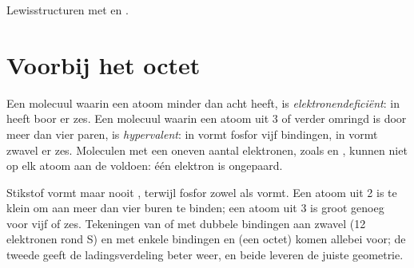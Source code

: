 \begin{omfigure}

{\small Lewisstructuren met  en .}
\end{omfigure}

\section{Voorbij het octet}

\begin{definition}\label{def:b1:lewis-resonance-vsepr:hypervalent}
Een molecuul waarin een atoom minder dan acht  heeft,
is \emph{elektronendeficiënt}:
in  heeft boor er zes. Een molecuul waarin een atoom uit 
3 of verder omringd is door meer dan vier paren, is
\emph{hypervalent}: in  vormt fosfor vijf
bindingen, in  vormt zwavel er zes. Moleculen met een oneven
aantal elektronen, zoals  en , kunnen niet op elk atoom
aan de  voldoen: één elektron is ongepaard.
\end{definition}

\begin{remark}\label{rem:b1:lewis-resonance-vsepr:hypervalent}
Stikstof vormt  maar nooit , terwijl fosfor zowel
 als  vormt. Een atoom uit  2 is te klein om aan
meer dan vier buren te binden; een atoom uit  3 is groot genoeg
voor vijf of zes. Tekeningen van  of  met dubbele
bindingen aan zwavel (12 elektronen rond S) en met enkele bindingen en
 (een octet) komen allebei voor; de tweede geeft de
ladingsverdeling beter weer, en beide leveren de juiste geometrie.
\end{remark}

